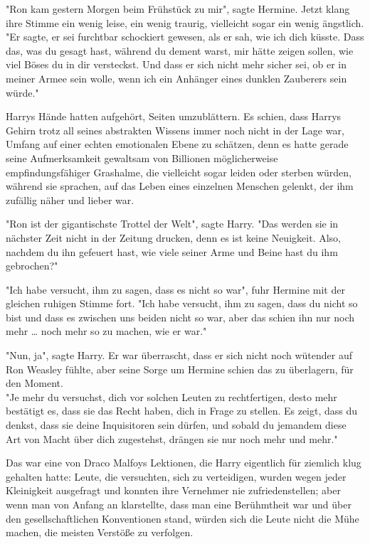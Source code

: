 {"Ron kam gestern Morgen beim Frühstück zu mir", sagte Hermine. Jetzt klang ihre Stimme ein wenig leise, ein wenig traurig, vielleicht sogar ein wenig ängstlich.\\ "Er sagte, er sei furchtbar schockiert gewesen, als er sah, wie ich dich küsste. Dass das, was du gesagt hast, während du dement warst, mir hätte zeigen sollen, wie viel Böses du in dir versteckst. Und dass er sich nicht mehr sicher sei, ob er in meiner Armee sein wolle, wenn ich ein Anhänger eines dunklen Zauberers sein würde."

Harrys Hände hatten aufgehört, Seiten umzublättern. Es schien, dass Harrys Gehirn trotz all seines abstrakten Wissens immer noch nicht in der Lage war, Umfang auf einer echten emotionalen Ebene zu schätzen, denn es hatte gerade seine Aufmerksamkeit gewaltsam von Billionen möglicherweise empfindungsfähiger Grashalme, die vielleicht sogar leiden oder sterben würden, während sie sprachen, auf das Leben eines einzelnen Menschen gelenkt, der ihm zufällig näher und lieber war.

"Ron ist der gigantischste Trottel der Welt", sagte Harry. "Das werden sie in nächster Zeit nicht in der Zeitung drucken, denn es ist keine Neuigkeit. Also, nachdem du ihn gefeuert hast, wie viele seiner Arme und Beine hast du ihm gebrochen?"

"Ich habe versucht, ihm zu sagen, dass es nicht so war", fuhr Hermine mit der gleichen ruhigen Stimme fort. "Ich habe versucht, ihm zu sagen, dass du nicht so bist und dass es zwischen uns beiden nicht so war, aber das schien ihn nur noch mehr … noch mehr so zu machen, wie er war."

"Nun, ja", sagte Harry. Er war überrascht, dass er sich nicht noch wütender auf Ron Weasley fühlte, aber seine Sorge um Hermine schien das zu überlagern, für den Moment.\\ "Je mehr du versuchst, dich vor solchen Leuten zu rechtfertigen, desto mehr bestätigt es, dass sie das Recht haben, dich in Frage zu stellen. Es zeigt, dass du denkst, dass sie deine Inquisitoren sein dürfen, und sobald du jemandem diese Art von Macht über dich zugestehst, drängen sie nur noch mehr und mehr."

Das war eine von Draco Malfoys Lektionen, die Harry eigentlich für ziemlich klug gehalten hatte: Leute, die versuchten, sich zu verteidigen, wurden wegen jeder Kleinigkeit ausgefragt und konnten ihre Vernehmer nie zufriedenstellen; aber wenn man von Anfang an klarstellte, dass man eine Berühmtheit war und über den gesellschaftlichen Konventionen stand, würden sich die Leute nicht die Mühe machen, die meisten Verstöße zu verfolgen.

}
